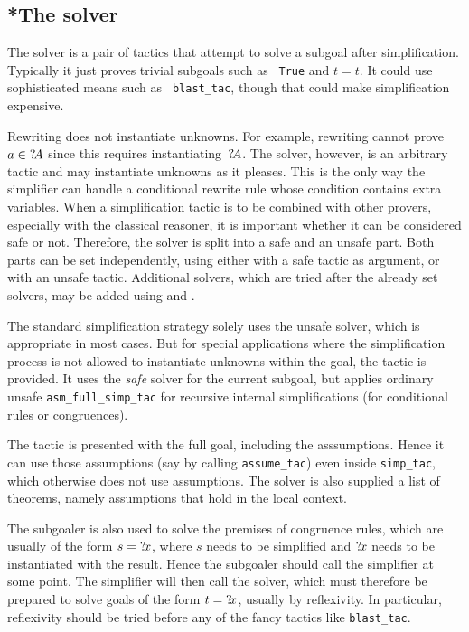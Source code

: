 \subsection{*The solver}\label{sec:simp-solver}
The solver is a pair of tactics that attempt to solve a subgoal after
simplification.  Typically it just proves trivial subgoals such as {\tt
  True} and $t=t$.  It could use sophisticated means such as {\tt
  blast_tac}, though that could make simplification expensive. 

Rewriting does not instantiate unknowns.  For example, rewriting
cannot prove $a\in {?\!A}$ since this requires
instantiating~${?\!A}$.  The solver, however, is an arbitrary tactic
and may instantiate unknowns as it pleases.  This is the only way the
simplifier can handle a conditional rewrite rule whose condition
contains extra variables. When a simplification tactic is to be
combined with other provers, especially with the classical reasoner,
it is important whether it can be considered safe or not. Therefore,
the solver is split into a safe and an unsafe part. Both parts can be
set independently, using either  with a safe
tactic as argument, or  with an unsafe tactic.
Additional solvers, which are tried after the already set solvers, may
be added using  and .

The standard simplification strategy solely uses the unsafe solver,
which is appropriate in most cases. But for special applications where
the simplification process is not allowed to instantiate unknowns
within the goal, the tactic  is
provided. It uses the \emph{safe} solver for the current subgoal, but
applies ordinary unsafe {\tt asm_full_simp_tac} for recursive internal
simplifications (for conditional rules or congruences).

The tactic is presented with the full goal, including the asssumptions.
Hence it can use those assumptions (say by calling {\tt assume_tac}) even
inside {\tt simp_tac}, which otherwise does not use assumptions.  The
solver is also supplied a list of theorems, namely assumptions that hold in
the local context.

The subgoaler is also used to solve the premises of congruence rules, which
are usually of the form $s = {?\!x}$, where $s$ needs to be simplified and
${?\!x}$ needs to be instantiated with the result.  Hence the subgoaler
should call the simplifier at some point.  The simplifier will then call the
solver, which must therefore be prepared to solve goals of the form $t =
{?\!x}$, usually by reflexivity.  In particular, reflexivity should be
tried before any of the fancy tactics like {\tt blast_tac}.  

